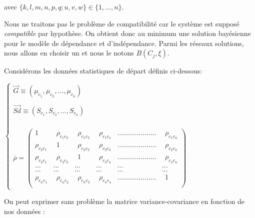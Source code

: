 \documentclass[a4paper]{article}
\begin{document}
avec $\{k,l,m,n,p,q;u,v,w\}\in \{1,...,n\}$.

Nous ne traitons pas le problème de compatibilité car le système est supposé \textit{compatible} par hypothèse.
 On obtient donc au minimum une solution bayésienne pour le modèle de dépendance et d'indépendance.
Parmi les réseaux solutions, nous allons en choisir un et nous le notons $B(C_{j},\xi)$.

Considérons les données statistiques de départ définis ci-dessous:

$\left\lbrace 
\begin{array}{lcl} 
\vec{G}\equiv (\mu_{c_{1}},\mu_{c_{2}},...,\mu_{c_{n}})\\ \\ 
\vec{Sd} \equiv (S_{c_{1}},S_{c_{2}},...,S_{c_{n}})\\ \\  \\ \\
\overline{\rho}=\begin{pmatrix}
1&\ \ \rho_{c_{1}c_{2}}&\ \ \rho_{c_{1}c_{3}}&\ \ \rho_{c_{1}c_{4}}&.................... &\ \ \rho_{c_{1}c_{n}}\\ 
\rho_{c_{2}c_{1}}&\ \ 1&\ \ \rho_{c_{2}c_{3}}&\ \ \rho_{c_{2}c_{4}}&....................&\ \ \rho_{c_{2}c_{n}}\\ 
\rho_{c_{3}c_{1}}&\ \ \rho_{c_{3}c_{2}}&\ \ 1&\ \ \rho_{c_{3}c_{4}}&....................&\ \ \rho_{c_{3}c_{n}}\\ 
...&...&...&...&...&...  \\ 
...&...&...&...&...&...  \\ 

\rho_{c_{n}c_{1}}&\ \ \rho_{c_{n}c_{2}}&\ \ \rho_{c_{n}c_{3}}&\ \ \rho_{c_{n}c_{4}}&....................&\ \ 1\\ 

\end{pmatrix}
\end{array}\right.$


On peut exprimer sans problème la matrice variance-covariance en fonction de nos données  :
\end{document}
